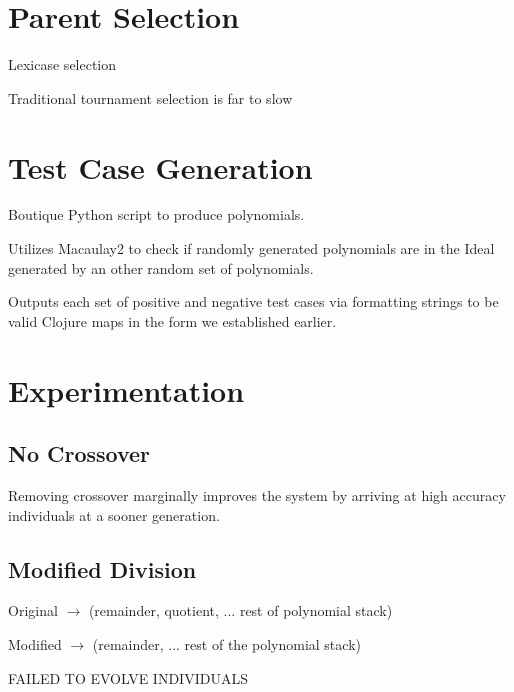 \documentclass[20pt]{extarticle}
\begin{document}
\newpage
\section*{Parent Selection}

Lexicase selection

Traditional tournament selection is far to slow


\newpage
\section*{Test Case Generation}

Boutique Python script to produce polynomials. 

Utilizes Macaulay2 to check if randomly generated polynomials are in the Ideal generated by an other random set of polynomials.

Outputs each set of positive and negative test cases via formatting strings to be valid Clojure maps in the form we established earlier.

\newpage
\section*{Experimentation}
\subsection*{No Crossover}

Removing crossover marginally improves the system by arriving at high accuracy individuals at a sooner generation.

\subsection*{Modified Division}

\noindent Original $\rightarrow$ (remainder, quotient, ... rest of polynomial stack)

\noindent Modified $\rightarrow$ (remainder, ... rest of the polynomial stack)

\noindent FAILED TO EVOLVE INDIVIDUALS
\end{document}
